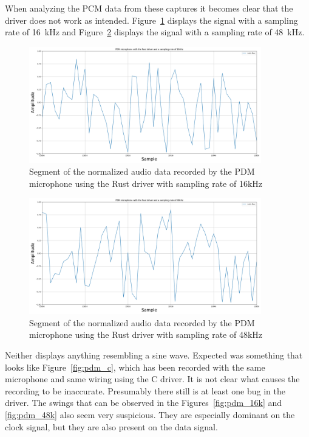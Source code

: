 When analyzing the PCM data from these captures it becomes clear that the driver does not work as intended.
Figure~\ref{fig:pdm_rust_16k} displays the signal with a sampling rate of \SI{16}{\kilo\hertz} and
Figure~\ref{fig:pdm_rust_48k} displays the signal with a sampling rate of \SI{48}{\kilo\hertz}.

\begin{figure}[H]
    \centering
    \includegraphics[width=0.9\textwidth]{figures/pdm/pdm_rust_16k.png}
    \caption[Segment of the normalized audio data recorded by the PDM microphone using the Rust driver with sampling rate of 16kHz]{Segment of the normalized audio data recorded by the PDM microphone using the Rust driver with sampling rate of 16kHz}
    \label{fig:pdm_rust_16k}
\end{figure}

\begin{figure}[H]
    \centering
    \includegraphics[width=0.9\textwidth]{figures/pdm/pdm_rust_48k.png}
    \caption[Segment of the normalized audio data recorded by the PDM microphone using the Rust driver with sampling rate of 48kHz]{Segment of the normalized audio data recorded by the PDM microphone using the Rust driver with sampling rate of 48kHz}
    \label{fig:pdm_rust_48k}
\end{figure}

Neither displays anything resembling a sine wave.
Expected was something that looks like Figure~\ref{fig:pdm_c}, which has been recorded with the same microphone and same wiring using the C driver.
It is not clear what causes the recording to be inaccurate.
Presumably there still is at least one bug in the driver.
The swings that can be observed in the Figures~\ref{fig:pdm_16k} and \ref{fig:pdm_48k} also seem very suspicious.
They are especially dominant on the clock signal, but they are also present on the data signal.

